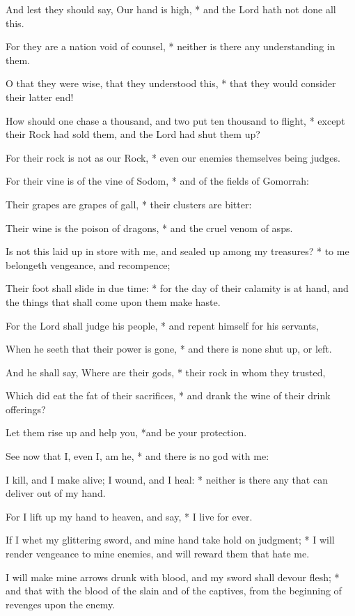 \begin{multicols}{2}
And lest they should say, Our hand is high, * and the Lord hath not done all this.\par
For they are a nation void of counsel, * neither is there any understanding in them.\par
O that they were wise, that they understood this, * that they would consider their latter end!\par
How should one chase a thousand, {\dag} and two put ten thousand to flight, * except their Rock had sold them, and the Lord had shut them up?\par
For their rock is not as our Rock, * even our enemies themselves being judges.\par
For their vine is of the vine of Sodom, * and of the fields of Gomorrah:\par
Their grapes are grapes of gall, * their clusters are bitter:\par
Their wine is the poison of dragons, * and the cruel venom of asps.\par
Is not this laid up in store with me, {\dag} and sealed up among my treasures? * to me belongeth vengeance, and recompence;\par
Their foot shall slide in due time: * for the day of their calamity is at hand, and the things that shall come upon them make haste.\par
For the Lord shall judge his people, * and repent himself for his servants,\par
When he seeth that their power is gone, * and there is none shut up, or left.\par
And he shall say, Where are their gods, * their rock in whom they trusted,\par
Which did eat the fat of their sacrifices, * and drank the wine of their drink offerings?\par
Let them rise up and help you, *and be your protection.\par
See now that I, even I, am he, * and there is no god with me:\par
I kill, and I make alive; {\dag} I wound, and I heal: * neither is there any that can deliver out of my hand.\par
For I lift up my hand to heaven, and say, * I live for ever.\par
If I whet my glittering sword, and mine hand take hold on judgment; * I will render vengeance to mine enemies, and will reward them that hate me.\par
I will make mine arrows drunk with blood, {\dag} and my sword shall devour flesh; * and that with the blood of the slain and of the captives, from the beginning of revenges upon the enemy.\par

\end{multicols}
